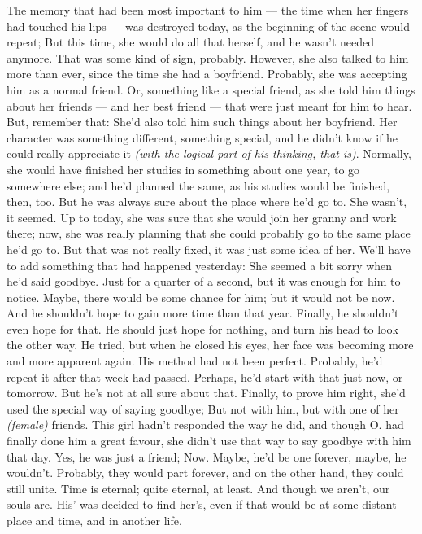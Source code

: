 The memory that had been most important to him --- the time when her fingers had touched his lips --- was destroyed today, as the beginning of the scene would repeat; But this time, she would do all that herself, and he wasn't needed anymore. 
That was some kind of sign, probably. 
However, she also talked to him more than ever, since the time she had a boyfriend. 
Probably, she was accepting him as a normal friend. 
Or, something like a special friend, as she told him things about her friends --- and her best friend --- that were just meant for him to hear. 
But, remember that: She'd also told him such things about her boyfriend. 
Her character was something different, something special, and he didn't know if he could really appreciate it \emph{(with the logical part of his thinking, that is)}. 
Normally, she would have finished her studies in something about one year, to go somewhere else; and he'd planned the same, as his studies would be finished, then, too. 
But he was always sure about the place where he'd go to. 
She wasn't, it seemed. 
Up to today, she was sure that she would join her granny and work there; now, she was really planning that she could probably go to the same place he'd go to. 
But that was not really fixed, it was just some idea of her. 
We'll have to add something that had happened yesterday: She seemed a bit sorry when he'd said goodbye. 
Just for a quarter of a second, but it was enough for him to notice. 
Maybe, there would be some chance for him; but it would not be now. 
And he shouldn't hope to gain more time than that year. 
Finally, he shouldn't even hope for that. 
He should just hope for nothing, and turn his head to look the other way. 
He tried, but when he closed his eyes, her face was becoming more and more apparent again. His method had not been perfect. 
Probably, he'd repeat it after that week had passed. 
Perhaps, he'd start with that just now, or tomorrow. 
But he's not at all sure about that. 
Finally, to prove him right, she'd used the special way of saying goodbye; But not with him, but with one of her \emph{(female)} friends. This girl hadn't responded the way he did, and though O. had finally done him a great favour, she didn't use that way to say goodbye with him that day. 
Yes, he was just a friend; Now. 
Maybe, he'd be one forever, maybe, he wouldn't. 
Probably, they would part forever, and on the other hand, they could still unite. 
Time is eternal; quite eternal, at least. 
And though we aren't, our souls are. 
His' was decided to find her's, even if that would be at some distant place and time, and in another life. 
